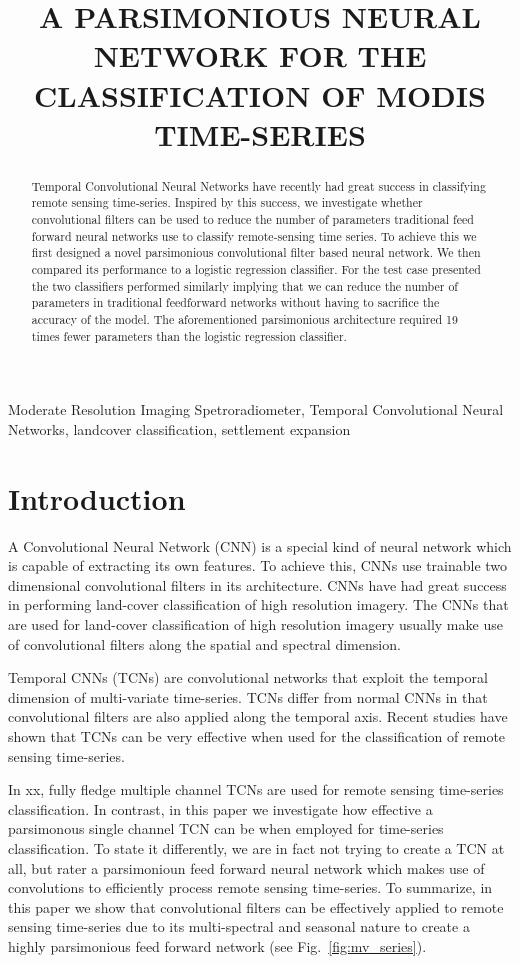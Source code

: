 \documentclass{article}
\title{A PARSIMONIOUS NEURAL NETWORK FOR THE CLASSIFICATION OF MODIS TIME-SERIES}
\begin{document}
%
\maketitle
%
\begin{abstract}
Temporal Convolutional Neural Networks have recently had great success in classifying remote sensing time-series. Inspired by this success, we  investigate whether convolutional filters can be used to reduce the number of parameters traditional feed forward neural networks use to classify remote-sensing time series. To achieve this we first designed a novel parsimonious convolutional filter based neural network. We then compared its performance to a logistic regression classifier. For the test case presented the two classifiers performed similarly implying that we can reduce the number of parameters in traditional feedforward networks without having to sacrifice the accuracy of the model. The aforementioned parsimonious architecture required 19 times fewer parameters than the logistic regression classifier.     
\end{abstract}
%
\begin{keywords}
Moderate Resolution Imaging Spetroradiometer, Temporal Convolutional Neural Networks, landcover classification, settlement expansion
\end{keywords}
%
\section{Introduction}
\label{sec:intro}
A Convolutional Neural Network (CNN) is a special kind of neural network which is capable of extracting its own features. To achieve this, CNNs use trainable two dimensional convolutional filters in its architecture. CNNs have had great success in performing land-cover classification of high resolution imagery. The CNNs that are used for land-cover classification of high resolution imagery usually make use of convolutional filters along the spatial and spectral dimension.

Temporal CNNs (TCNs) are convolutional networks that
exploit the temporal dimension of multi-variate time-series. TCNs differ from normal CNNs in that convolutional filters are also applied along the temporal axis. Recent studies have shown that TCNs can be very effective when used for the classification of remote sensing time-series. 

In xx, fully fledge multiple channel TCNs are used for remote sensing time-series classification. In contrast, in this paper we investigate how effective a parsimonous single channel TCN can be when employed for time-series classification. To state it differently, we are in fact not trying to create a TCN at all, but rater a parsimonioun feed forward neural network which makes use of convolutions to efficiently process remote sensing time-series. To summarize, in this paper we show that convolutional filters can be effectively applied to remote sensing time-series due to its multi-spectral and seasonal nature to create a highly parsimonious feed forward network (see Fig.~\ref{fig:mv_series}).   
\end{document}
